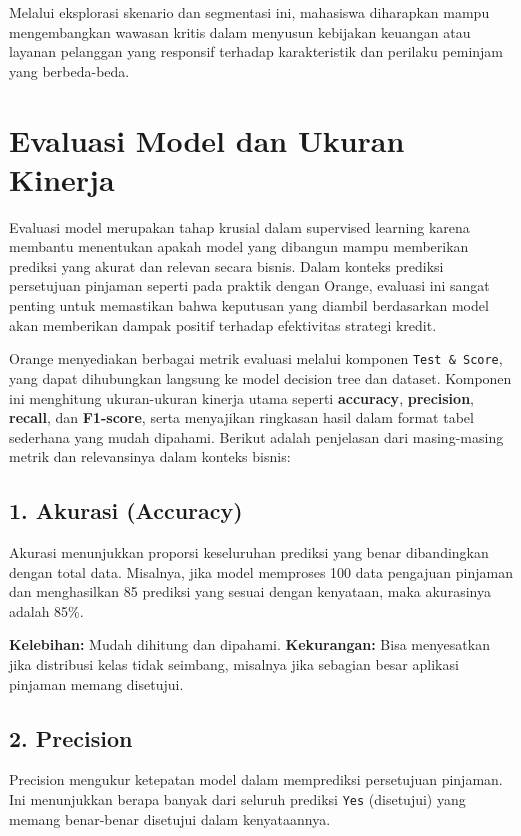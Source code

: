 Melalui eksplorasi skenario dan segmentasi ini, mahasiswa diharapkan mampu mengembangkan wawasan kritis dalam menyusun kebijakan keuangan atau layanan pelanggan yang responsif terhadap karakteristik dan perilaku peminjam yang berbeda-beda.



\section{Evaluasi Model dan Ukuran Kinerja}

Evaluasi model merupakan tahap krusial dalam supervised learning karena membantu menentukan apakah model yang dibangun mampu memberikan prediksi yang akurat dan relevan secara bisnis. Dalam konteks prediksi persetujuan pinjaman seperti pada praktik dengan Orange, evaluasi ini sangat penting untuk memastikan bahwa keputusan yang diambil berdasarkan model akan memberikan dampak positif terhadap efektivitas strategi kredit.

Orange menyediakan berbagai metrik evaluasi melalui komponen \texttt{Test \& Score}, yang dapat dihubungkan langsung ke model decision tree dan dataset. Komponen ini menghitung ukuran-ukuran kinerja utama seperti \textbf{accuracy}, \textbf{precision}, \textbf{recall}, dan \textbf{F1-score}, serta menyajikan ringkasan hasil dalam format tabel sederhana yang mudah dipahami. Berikut adalah penjelasan dari masing-masing metrik dan relevansinya dalam konteks bisnis:

\subsection*{1. Akurasi (Accuracy)}

Akurasi menunjukkan proporsi keseluruhan prediksi yang benar dibandingkan dengan total data. Misalnya, jika model memproses 100 data pengajuan pinjaman dan menghasilkan 85 prediksi yang sesuai dengan kenyataan, maka akurasinya adalah 85\%.

\textbf{Kelebihan:} Mudah dihitung dan dipahami.  
\textbf{Kekurangan:} Bisa menyesatkan jika distribusi kelas tidak seimbang, misalnya jika sebagian besar aplikasi pinjaman memang disetujui.

\subsection*{2. Precision}

Precision mengukur ketepatan model dalam memprediksi persetujuan pinjaman. Ini menunjukkan berapa banyak dari seluruh prediksi \texttt{Yes} (disetujui) yang memang benar-benar disetujui dalam kenyataannya.

